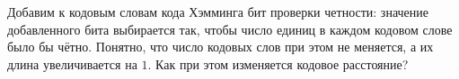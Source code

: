Добавим к кодовым словам кода Хэмминга бит проверки четности: значение добавленного бита выбирается так,
чтобы число единиц в каждом кодовом слове было бы чётно. Понятно, что число кодовых слов при этом не
меняется, а их длина увеличивается на $1$. Как при этом изменяется кодовое расстояние?
